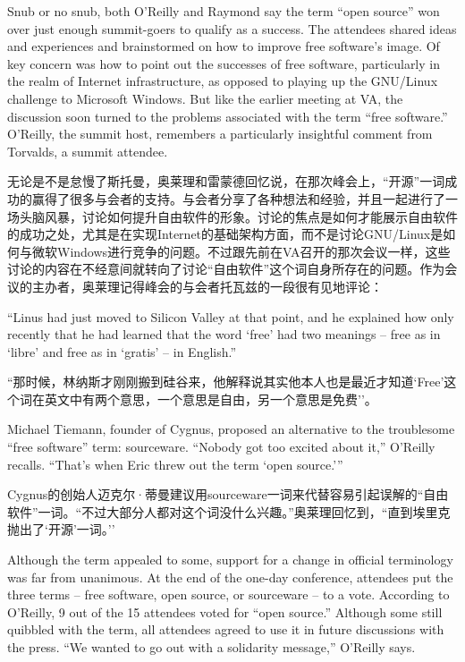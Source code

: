 \ifdefined\eng
Snub or no snub, both O'Reilly and Raymond say the term ``open source'' won over just enough summit-goers to qualify as a success. The attendees shared ideas and experiences and brainstormed on how to improve free software's image. Of key concern was how to point out the successes of free software, particularly in the realm of Internet infrastructure, as opposed to playing up the GNU/Linux challenge to Microsoft Windows. But like the earlier meeting at VA, the discussion soon turned to the problems associated with the term ``free software.'' O'Reilly, the summit host, remembers a particularly insightful comment from Torvalds, a summit attendee.
\fi

\ifdefined\chs
无论是不是怠慢了斯托曼，奥莱理和雷蒙德回忆说，在那次峰会上，``开源''一词成功的赢得了很多与会者的支持。与会者分享了各种想法和经验，并且一起进行了一场头脑风暴，讨论如何提升自由软件的形象。讨论的焦点是如何才能展示自由软件的成功之处，尤其是在实现Internet的基础架构方面，而不是讨论GNU/Linux是如何与微软Windows进行竞争的问题。不过跟先前在VA召开的那次会议一样，这些讨论的内容在不经意间就转向了讨论``自由软件''这个词自身所存在的问题。作为会议的主办者，奥莱理记得峰会的与会者托瓦兹的一段很有见地评论：
\fi

\ifdefined\eng
``Linus had just moved to Silicon Valley at that point, and he explained how only recently that he had learned that the word `free' had two meanings -- free as in `libre' and free as in `gratis' -- in English.''
\fi

\ifdefined\chs
``那时候，林纳斯才刚刚搬到硅谷来，他解释说其实他本人也是最近才知道`Free'这个词在英文中有两个意思，一个意思是自由，另一个意思是免费''。
\fi

\ifdefined\eng
Michael Tiemann, founder of Cygnus, proposed an alternative to the troublesome ``free software'' term: sourceware. ``Nobody got too excited about it,'' O'Reilly recalls. ``That's when Eric threw out the term `open source.'\hspace{0.01in}''
\fi

\ifdefined\chs
Cygnus的创始人迈克尔·蒂曼建议用sourceware一词来代替容易引起误解的``自由软件''一词。``不过大部分人都对这个词没什么兴趣。''奥莱理回忆到，``直到埃里克抛出了`开源'一词。''
\fi

\ifdefined\eng
Although the term appealed to some, support for a change in official terminology was far from unanimous. At the end of the one-day conference, attendees put the three terms -- free software, open source, or sourceware -- to a vote. According to O'Reilly, 9 out of the 15 attendees voted for ``open source.'' Although some still quibbled with the term, all attendees agreed to use it in future discussions with the press. ``We wanted to go out with a solidarity message,'' O'Reilly says.
\fi

